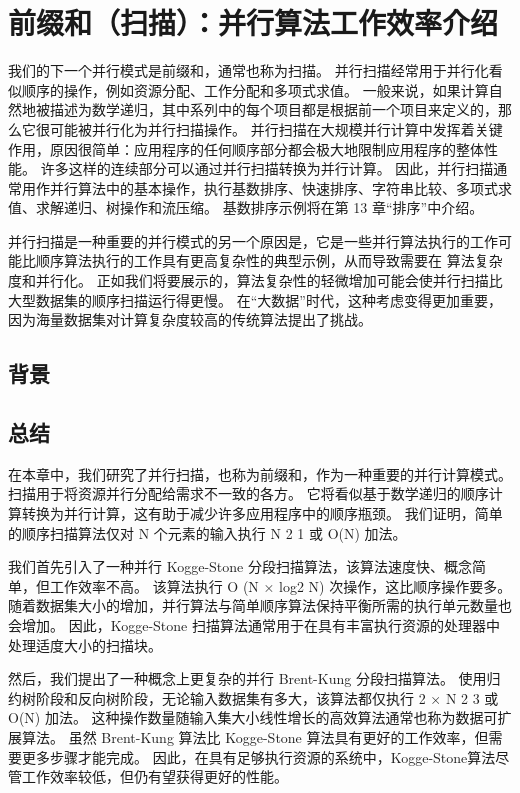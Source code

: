 \section{前缀和（扫描）：并行算法工作效率介绍}
我们的下一个并行模式是前缀和，通常也称为扫描。 并行扫描经常用于并行化看似顺序的操作，例如资源分配、工作分配和多项式求值。 一般来说，如果计算自然地被描述为数学递归，其中系列中的每个项目都是根据前一个项目来定义的，那么它很可能被并行化为并行扫描操作。 并行扫描在大规模并行计算中发挥着关键作用，原因很简单：应用程序的任何顺序部分都会极大地限制应用程序的整体性能。 许多这样的连续部分可以通过并行扫描转换为并行计算。 因此，并行扫描通常用作并行算法中的基本操作，执行基数排序、快速排序、字符串比较、多项式求值、求解递归、树操作和流压缩。 基数排序示例将在第 13 章“排序”中介绍。

并行扫描是一种重要的并行模式的另一个原因是，它是一些并行算法执行的工作可能比顺序算法执行的工作具有更高复杂性的典型示例，从而导致需要在 算法复杂度和并行化。 正如我们将要展示的，算法复杂性的轻微增加可能会使并行扫描比大型数据集的顺序扫描运行得更慢。 在“大数据”时代，这种考虑变得更加重要，因为海量数据集对计算复杂度较高的传统算法提出了挑战。

\subsection{背景}

\subsection{总结}
在本章中，我们研究了并行扫描，也称为前缀和，作为一种重要的并行计算模式。 扫描用于将资源并行分配给需求不一致的各方。 它将看似基于数学递归的顺序计算转换为并行计算，这有助于减少许多应用程序中的顺序瓶颈。 我们证明，简单的顺序扫描算法仅对 N 个元素的输入执行 N 2 1 或 O(N) 加法。

我们首先引入了一种并行 Kogge-Stone 分段扫描算法，该算法速度快、概念简单，但工作效率不高。 该算法执行 O (N × log2 N) 次操作，这比顺序操作要多。 随着数据集大小的增加，并行算法与简单顺序算法保持平衡所需的执行单元数量也会增加。 因此，Kogge-Stone 扫描算法通常用于在具有丰富执行资源的处理器中处理适度大小的扫描块。

然后，我们提出了一种概念上更复杂的并行 Brent-Kung 分段扫描算法。 使用归约树阶段和反向树阶段，无论输入数据集有多大，该算法都仅执行 2 × N 2 3 或 O(N) 加法。 这种操作数量随输入集大小线性增长的高效算法通常也称为数据可扩展算法。 虽然 Brent-Kung 算法比 Kogge-Stone 算法具有更好的工作效率，但需要更多步骤才能完成。 因此，在具有足够执行资源的系统中，Kogge-Stone算法尽管工作效率较低，但仍有望获得更好的性能。

